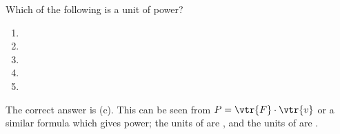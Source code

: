 
\begin{problem}[AO1989PIQ1l] 
{Which of the following is a unit of power?
\begin{enumerate}
	\item {}
	\item {}
	\item {}\answer
	\item {}
	\item {}
\end{enumerate}
}
{}
{The correct answer is (c). This can be seen from $P=\vtr{F}\cdot\vtr{v}$ or a similar formula which gives power; the units of  are , and the units of  are .}
\end{problem}